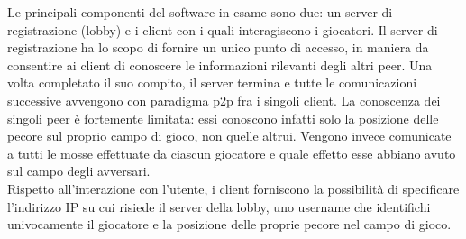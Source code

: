 Le principali componenti del software in esame sono due: un server di 
registrazione (lobby) e i client con i quali interagiscono i giocatori.
Il server di registrazione ha lo scopo di fornire un unico punto di accesso, 
in maniera da consentire ai client di conoscere le informazioni rilevanti degli 
altri peer. Una volta completato il suo compito, il server termina e tutte le 
comunicazioni successive avvengono con paradigma p2p fra i singoli client.
La conoscenza dei singoli peer è fortemente limitata: essi conoscono infatti 
solo la posizione delle pecore sul proprio campo di gioco, non quelle altrui. 
Vengono invece comunicate a tutti le mosse effettuate da ciascun giocatore e 
quale effetto esse abbiano avuto sul campo degli avversari.
\\
Rispetto all'interazione con l'utente, i client forniscono la possibilità di 
specificare l'indirizzo IP su cui risiede il server della lobby, uno username 
che identifichi univocamente il giocatore e la posizione delle proprie pecore 
nel campo di gioco.